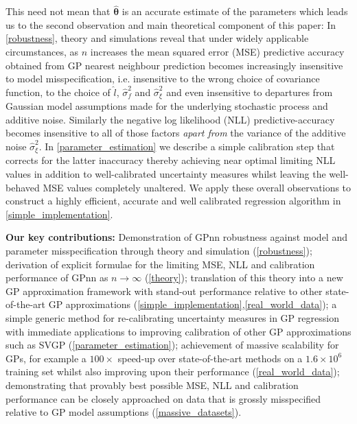This need not mean that $\hat{\bm{\theta}}$ is an accurate estimate of the parameters which leads us to the second observation and main theoretical component of this paper: In \autoref{robustness}, theory and simulations reveal that under widely applicable circumstances, as $n$ increases the mean squared error (MSE) predictive accuracy obtained from GP nearest neighbour prediction becomes increasingly insensitive to model misspecification, i.e. insensitive to the wrong choice of covariance function, to the choice of $\hat{l}$, $\hat{\sigma}_f^2$ and $\hat{\sigma}_\xi^2$ and even insensitive to departures from Gaussian model assumptions made for the underlying stochastic process and additive noise. Similarly the negative log likelihood (NLL) predictive-accuracy becomes insensitive to all of those factors {\it apart from} the variance of the additive noise $\hat{\sigma}_\xi^2$. In \ref{parameter_estimation} we describe a simple calibration step that corrects for the latter inaccuracy thereby achieving near optimal limiting NLL values in addition to well-calibrated uncertainty measures whilst leaving the well-behaved MSE values completely unaltered. We apply these overall observations to construct a highly efficient, accurate and well calibrated regression algorithm in \autoref{simple_implementation}.



\textbf{Our key contributions:} Demonstration of GPnn robustness against model and parameter misspecification through theory and simulation (\ref{robustness}); derivation of explicit formulae for the limiting MSE, NLL and calibration performance of GPnn as $n \rightarrow \infty$ (\ref{theory}); translation of this theory into a new GP approximation framework with stand-out performance relative to other state-of-the-art GP approximations (\ref{simple_implementation},\ref{real_world_data}); a simple generic method for re-calibrating uncertainty measures in GP regression with immediate applications to improving calibration of other GP approximations such as SVGP (\ref{parameter_estimation}); achievement of massive scalability for GPs, for example a $100 \times$ speed-up over state-of-the-art methods on a $1.6 \times 10^6$ training set whilst also improving upon their performance (\ref{real_world_data}); demonstrating that provably best possible MSE, NLL and calibration performance can be closely approached on data that is grossly misspecified relative to GP model assumptions (\ref{massive_datasets}).



